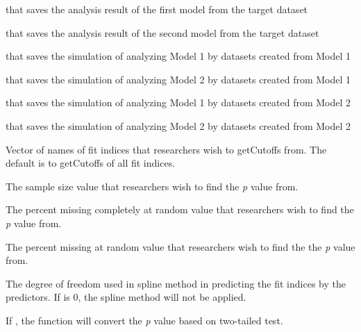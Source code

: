 \documentclass[a4paper]{book}
\begin{document}
%
\begin{Arguments}
\begin{ldescription}
\item[\code{outMod1}] 
 that saves the analysis result of the first model from the target dataset

\item[\code{outMod2}] 
 that saves the analysis result of the second model from the target dataset

\item[\code{dat1Mod1}] 
 that saves the simulation of analyzing Model 1 by datasets created from Model 1

\item[\code{dat1Mod2}] 
 that saves the simulation of analyzing Model 2 by datasets created from Model 1

\item[\code{dat2Mod1}] 
 that saves the simulation of analyzing Model 1 by datasets created from Model 2

\item[\code{dat2Mod2}] 
 that saves the simulation of analyzing Model 2 by datasets created from Model 2

\item[\code{usedFit}] 
Vector of names of fit indices that researchers wish to getCutoffs from. The default is to getCutoffs of all fit indices.

\item[\code{nVal}] 
The sample size value that researchers wish to find the \emph{p} value from.

\item[\code{pmMCARval}] 
The percent missing completely at random value that researchers wish to find the \emph{p} value from.

\item[\code{pmMARval}] 
The percent missing at random value that researchers wish to find the the \emph{p} value from.

\item[\code{df}] 
The degree of freedom used in spline method in predicting the fit indices by the predictors. If  is 0, the spline method will not be applied.

\item[\code{onetailed}] 
If , the function will convert the \emph{p} value based on two-tailed test. 

\end{ldescription}
\end{Arguments}
\end{document}
